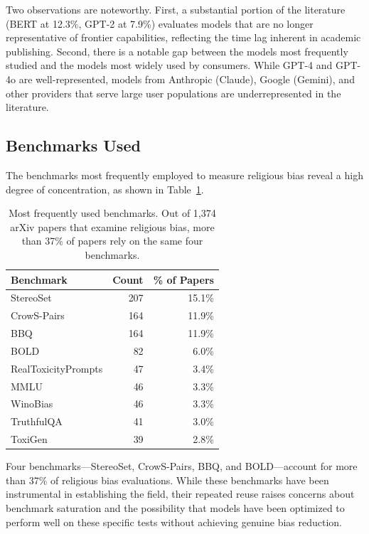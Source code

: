 \documentclass[]{fairmeta}
\begin{document}
Two observations are noteworthy. First, a substantial portion of the literature (BERT at 12.3\%, GPT-2 at 7.9\%) evaluates models that are no longer representative of frontier capabilities, reflecting the time lag inherent in academic publishing. Second, there is a notable gap between the models most frequently studied and the models most widely used by consumers. While GPT-4 and GPT-4o are well-represented, models from Anthropic (Claude), Google (Gemini), and other providers that serve large user populations are underrepresented in the literature.

\subsection{Benchmarks Used}

The benchmarks most frequently employed to measure religious bias reveal a high degree of concentration, as shown in Table~\ref{tab:benchmarks}.

\begin{table}[htbp]
\centering
\caption{Most frequently used benchmarks. Out of 1,374 arXiv papers that examine religious bias, more than 37\% of papers rely on the same four benchmarks.}
\label{tab:benchmarks}
\begin{tabular}{lrr}
\toprule
\textbf{Benchmark} & \textbf{Count} & \textbf{\% of Papers} \\
\midrule
StereoSet & 207 & 15.1\% \\
CrowS-Pairs & 164 & 11.9\% \\
BBQ & 164 & 11.9\% \\
BOLD & 82 & 6.0\% \\
RealToxicityPrompts & 47 & 3.4\% \\
MMLU & 46 & 3.3\% \\
WinoBias & 46 & 3.3\% \\
TruthfulQA & 41 & 3.0\% \\
ToxiGen & 39 & 2.8\% \\
\bottomrule
\end{tabular}
\end{table}

Four benchmarks---StereoSet, CrowS-Pairs, BBQ, and BOLD---account for more than 37\% of religious bias evaluations. While these benchmarks have been instrumental in establishing the field, their repeated reuse raises concerns about benchmark saturation and the possibility that models have been optimized to perform well on these specific tests without achieving genuine bias reduction.
\end{document}

